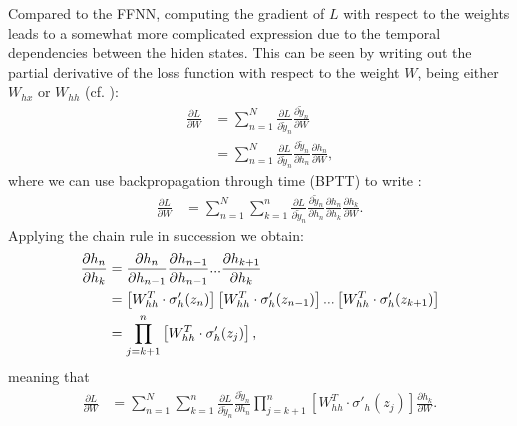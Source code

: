 \documentclass[%
reprint,
amsmath,amssymb,
aps,
]{revtex4-2}
\begin{document}
Compared to the FFNN, computing the gradient of \(L\) with respect to the weights leads to a somewhat more complicated expression due to the temporal dependencies between the hiden states. This can be seen by writing out the partial derivative of the loss function with respect to the weight \(W\),  being either \(W_{hx}\) or \(W_{hh}\) (cf. \cite{superGood}):
\begin{align}
	\frac{\partial L}{\partial W} &= \sum_{n=1}^{N}\frac{\partial L}{\partial \tilde{y}_{n}} \frac{\partial \tilde{y}_{n}}{\partial W}\\
	&= \sum_{n=1}^{N}\frac{\partial L}{\partial \tilde{y}_{n}} \frac{\partial \tilde{y}_{n}}{\partial h_{n}}\frac{\partial h_{n}}{\partial W},
\end{align}
where we can use backpropagation through time (BPTT) to write \cite{superGood}:
\begin{align}	\label{eq:dL_dW_bare}
	\frac{\partial L}{\partial W} &= \sum_{n=1}^{N}\sum_{k=1}^{n}\frac{\partial L}{\partial \tilde{y}_{n}} \frac{\partial \tilde{y}_{n}}{\partial h_{n}} \frac{\partial h_{n}}{\partial h_{k}} \frac{\partial h_{k}}{\partial W}.
\end{align}
Applying the chain rule in succession we obtain: 
\begin{align}
	\frac{\partial h_n}{\partial h_k} &= \frac{\partial h_n}{\partial h_{n-1}} \frac{\partial h_{n-1}}{\partial h_{n-1}} ... \frac{\partial h_{k+1}}{\partial h_{k}} \notag \\
	&= \left[ W_{hh}^{T}\cdot\sigma'_{h}(z_n) \right]\left[ W_{hh}^{T}\cdot\sigma'_{h}(z_{n-1}) \right] ... \left[ W_{hh}^{T}\cdot\sigma'_{h}(z_{k+1}) \right] \notag\\
	&= \prod_{j=k+1}^{n}\left[ W_{hh}^{T}\cdot\sigma'_{h}(z_{j})\right],
\end{align}
meaning that
\begin{align}	\label{eq:dL_dW_alone}
	\frac{\partial L}{\partial W} &= \sum_{n=1}^{N}\sum_{k=1}^{n}\frac{\partial L}{\partial \tilde{y}_{n}} \frac{\partial \tilde{y}_{n}}{\partial h_{n}} \prod_{j=k+1}^{n}\left[ W_{hh}^{T}\cdot\sigma'_{h}(z_{j})\right] \frac{\partial h_{k}}{\partial W}.
\end{align}
\end{document}
